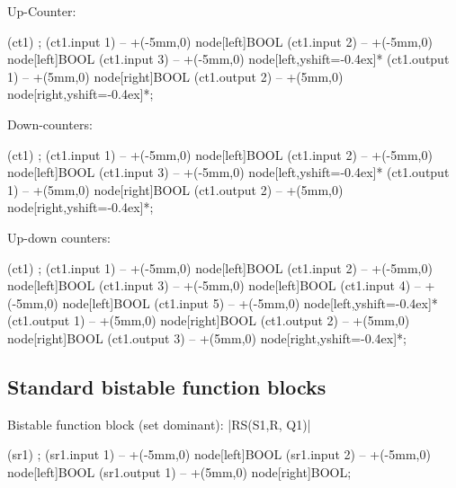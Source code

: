 \documentclass[a4paper]{ltxdoc}
\begin{document}
\noindent{}Up-Counter:
\begin{codeexample}[width=6cm,pre={\begin{tikzpicture}[circuit plc ladder,thick]},post=\end{tikzpicture}]
\node[block,inputs={>CU,R,PV},outputs={Q,CV},
   symbol=CTU\_*,minimum width=20mm] (ct1) {};
\draw (ct1.input 1) -- +(-5mm,0) node[left]{BOOL}
      (ct1.input 2) -- +(-5mm,0) node[left]{BOOL}
      (ct1.input 3) -- +(-5mm,0) node[left,yshift=-0.4ex]{*}
      (ct1.output 1) -- +(5mm,0) node[right]{BOOL}
      (ct1.output 2) -- +(5mm,0) node[right,yshift=-0.4ex]{*};
\end{codeexample}

\noindent{}Down-counters:
\begin{codeexample}[width=6cm,pre={\begin{tikzpicture}[circuit plc ladder,thick]},post=\end{tikzpicture}]
\node[block,inputs={>CD,LD,PV},outputs={Q,CV},
   symbol=CTD\_*,minimum width=20mm] (ct1) {};
\draw (ct1.input 1) -- +(-5mm,0) node[left]{BOOL}
      (ct1.input 2) -- +(-5mm,0) node[left]{BOOL}
      (ct1.input 3) -- +(-5mm,0) node[left,yshift=-0.4ex]{*}
      (ct1.output 1) -- +(5mm,0) node[right]{BOOL}
      (ct1.output 2) -- +(5mm,0) node[right,yshift=-0.4ex]{*};
\end{codeexample}

\noindent{}Up-down counters:
\begin{codeexample}[width=6cm,pre={\begin{tikzpicture}[circuit plc ladder,thick]},post=\end{tikzpicture}]
\node[block,inputs={>CU,>CD,R,LD,PV},outputs={QU,QD,CV},
     symbol=CTUD\_*,minimum width=20mm] (ct1) {};
\draw (ct1.input 1) -- +(-5mm,0) node[left]{BOOL}
      (ct1.input 2) -- +(-5mm,0) node[left]{BOOL}
      (ct1.input 3) -- +(-5mm,0) node[left]{BOOL}
      (ct1.input 4) -- +(-5mm,0) node[left]{BOOL}
      (ct1.input 5) -- +(-5mm,0) node[left,yshift=-0.4ex]{*}
      (ct1.output 1) -- +(5mm,0) node[right]{BOOL}
      (ct1.output 2) -- +(5mm,0) node[right]{BOOL}
      (ct1.output 3) -- +(5mm,0) node[right,yshift=-0.4ex]{*};
\end{codeexample}

\subsection{Standard bistable function blocks}

Bistable function block (set dominant): |RS(S1,R, Q1)|
\begin{codeexample}[width=6cm,pre={\begin{tikzpicture}[circuit plc ladder,thick]},post=\end{tikzpicture}]
\node[block,inputs={S1,R},outputs={Q1},
   symbol=SR,minimum width=18mm] (sr1) {};
\draw (sr1.input 1) -- +(-5mm,0) node[left]{BOOL}
      (sr1.input 2) -- +(-5mm,0) node[left]{BOOL}
      (sr1.output 1) -- +(5mm,0) node[right]{BOOL};
\end{codeexample}
\end{document}
